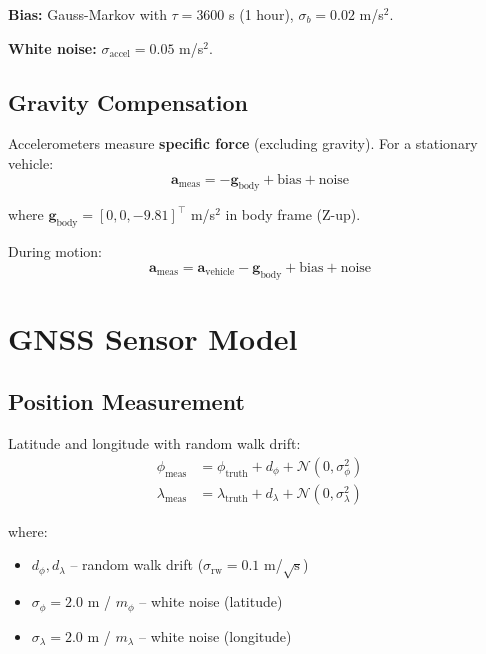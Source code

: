\documentclass[11pt,a4paper]{article}
\begin{document}
\textbf{Bias:} Gauss-Markov with $\tau = 3600$ s (1 hour), $\sigma_b = 0.02$ m/s$^2$.

\textbf{White noise:} $\sigma_{\text{accel}} = 0.05$ m/s$^2$.

\subsection{Gravity Compensation}

Accelerometers measure \textbf{specific force} (excluding gravity). For a stationary vehicle:
\begin{equation}
\mathbf{a}_{\text{meas}} = -\mathbf{g}_{\text{body}} + \text{bias} + \text{noise}
\end{equation}

where $\mathbf{g}_{\text{body}} = [0, 0, -9.81]^\top$ m/s$^2$ in body frame (Z-up).

During motion:
\begin{equation}
\mathbf{a}_{\text{meas}} = \mathbf{a}_{\text{vehicle}} - \mathbf{g}_{\text{body}} + \text{bias} + \text{noise}
\end{equation}

\section{GNSS Sensor Model}

\subsection{Position Measurement}

Latitude and longitude with random walk drift:
\begin{align}
\phi_{\text{meas}} &= \phi_{\text{truth}} + d_{\phi} + \mathcal{N}(0, \sigma_{\phi}^2) \\
\lambda_{\text{meas}} &= \lambda_{\text{truth}} + d_{\lambda} + \mathcal{N}(0, \sigma_{\lambda}^2)
\end{align}

where:
\begin{itemize}
    \item $d_{\phi}, d_{\lambda}$ -- random walk drift ($\sigma_{\text{rw}} = 0.1$ m/$\sqrt{\text{s}}$)
    \item $\sigma_{\phi} = 2.0$ m / $m_{\phi}$ -- white noise (latitude)
    \item $\sigma_{\lambda} = 2.0$ m / $m_{\lambda}$ -- white noise (longitude)
\end{itemize}
\end{document}
